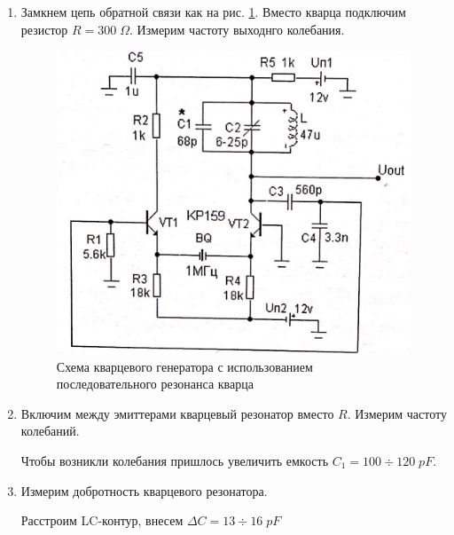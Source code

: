 \documentclass[a4paper]{article}
\begin{document}
\begin{enumerate}
    \item Замкнем цепь обратной связи как на рис. \ref{scheme_2}. Вместо кварца подключим резистор $R = 300\; \Omega.$ Измерим частоту выходнго колебания. \par 
    \begin{center}
    \end{center}
    
    \begin{figure}[H]
        \begin{center}
            \includegraphics[scale = 0.2]{scheme_2.jpg}
            \caption{Схема кварцевого генератора с использованием последовательного резонанса кварца}
            \label{scheme_2}
        \end{center}
    \end{figure}


    \item Включим между эмиттерами кварцевый резонатор вместо $R$. Измерим частоту колебаний. \par 
    
    Чтобы возникли колебания пришлось увеличить емкость $C_1 = 100 \div 120\; pF$.
    \begin{center}
    \end{center}


    \item Измерим добротность кварцевого резонатора. \par 
    Расстроим LC-контур, внесем $\Delta C = 13 \div 16\; pF$


\end{enumerate}
\end{document}
